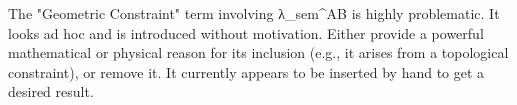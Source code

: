 The "Geometric Constraint" term involving λ_sem^AB is highly problematic. It looks ad hoc and is introduced without motivation. Either provide a powerful mathematical or physical reason for its inclusion (e.g., it arises from a topological constraint), or remove it. It currently appears to be inserted by hand to get a desired result.





